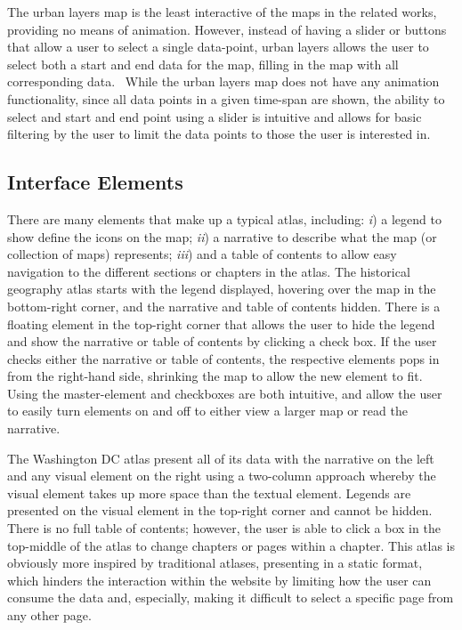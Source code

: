 \documentclass[11pt, draftcls, conference, onecolumn]{IEEEtran}
\begin{document}
The urban layers map is the least interactive of the maps in the related works, providing no means of animation. However, instead of having a slider or buttons that allow a user to select a single data-point, urban layers allows the user to select both a start and end data for the map, filling in the map with all corresponding data.~\cite{urban-layers-2014} While the urban layers map does not have any animation functionality, since all data points in a given time-span are shown, the ability to select and start and end point using a slider is intuitive and allows for basic filtering by the user to limit the data points to those the user is interested in.

\subsection{Interface Elements}
There are many elements that make up a typical atlas, including: {\it i}) a legend to show define the icons on the map; {\it ii}) a narrative to describe what the map (or collection of maps) represents; {\it iii}) and a table of contents to allow easy navigation to the different sections or chapters in the atlas. The historical geography atlas starts with the legend displayed, hovering over the map in the bottom-right corner, and the narrative and table of contents hidden. There is a floating element in the top-right corner that allows the user to hide the legend and show the narrative or table of contents by clicking a check box. If the user checks either the narrative or table of contents, the respective elements pops in from the right-hand side, shrinking the map to allow the new element to fit.~\cite{us-historical-atlas-2014} Using the master-element and checkboxes are both intuitive, and allow the user to easily turn elements on and off to either view a larger map or read the narrative.

The Washington DC atlas present all of its data with the narrative on the left and any visual element on the right using a two-column approach whereby the visual element takes up more space than the textual element. Legends are presented on the visual element in the top-right corner and cannot be hidden. There is no full table of contents; however, the user is able to click a box in the top-middle of the atlas to change chapters or pages within a chapter. This atlas is obviously more inspired by traditional atlases, presenting in a static format, which hinders the interaction within the website by limiting how the user can consume the data and, especially, making it difficult to select a specific page from any other page.
\end{document}

